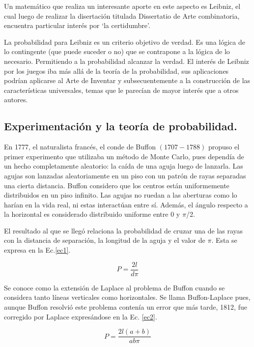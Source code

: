 \documentclass{rbf}
\begin{document}
Un matemático que realiza un interesante aporte en este aspecto es Leibniz, el cual luego de realizar la disertación titulada Dissertatio de Arte combinatoria, encuentra particular interés por ‘la certidumbre’.

La probabilidad para Leibniz es un criterio objetivo de verdad. Es una lógica de lo contingente (que puede suceder o no) que se contrapone a la lógica de lo necesario. Permitiendo a la probabilidad alcanzar la verdad. El interés de Leibniz por los juegos iba más allá de la teoría de la probabilidad, sus aplicaciones podrían aplicarse al Arte de Inventar y subsecuentemente a la construcción de las características universales, temas que le parecían de mayor interés que a otros autores.\cite{charles}

\subsection{Experimentación y la teoría de probabilidad.}

En 1777, el naturalista francés, el conde de Buffon $(1707-1788)$ propuso el primer experimento que utilizaba un método de Monte Carlo, pues dependía de un hecho completamente aleatorio: la caída de una aguja luego de lanzarla. Las agujas son lanzadas aleatoriamente en un piso con un patrón de rayas separadas una cierta distancia. Buffon considero que los centros están uniformemente distribuidos en un piso infinito. Las agujas no ruedan a las aberturas como lo harían en la vida real, ni estas interactúan entre sí. Además, el ángulo respecto a la horizontal es considerado distribuido uniforme entre 0 y $\pi$/2.

El resultado al que se llegó relaciona la probabilidad de cruzar una de las rayas con la distancia de separación, la longitud de la aguja y el valor de $\pi$. Esta se expresa en la Ec.\ref{ec1}.

\begin{equation}\label{ec1}
    P=\frac{2l}{d\pi}
\end{equation}

Se conoce como la extensión de Laplace al problema de Buffon cuando se considera tanto líneas verticales como horizontales. Se llama Buffon-Laplace pues, aunque Buffon resolvió este problema contenía un error que más tarde, 1812, fue corregido por Laplace expresándose en la Ec. \ref{ec2}.

\begin{equation}\label{ec2}
    P=\frac{2l(a+b)}{ab\pi}
\end{equation}
\end{document}

